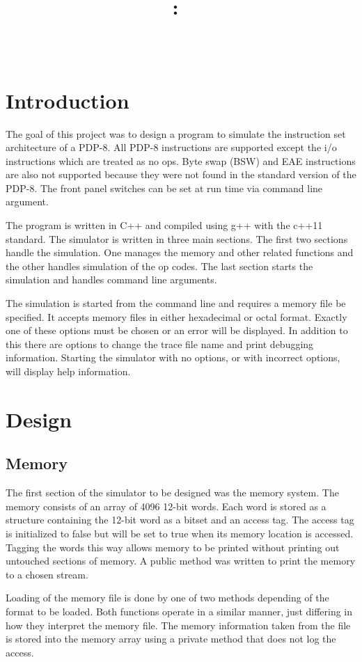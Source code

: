 \documentclass[12pt]{article}
\title{
\vspace{2in}
\textmd{\textbf{\hmwkClass:\ \hmwkTitle}}\\
\normalsize\vspace{0.1in}\small{\hmwkDueDate}\\
\vspace{3in}
\date{}
}
\author{\textbf{\hmwkAuthorName}}
\begin{document}
\maketitle
\newpage
\section{Introduction}
The goal of this project was to design a program to simulate the instruction set architecture of a PDP-8.  All PDP-8 instructions are supported except the i/o instructions which are treated as no ops. Byte swap (BSW) and EAE instructions are also not supported because they were not found in the standard version of the PDP-8. The front panel switches can be set at run time via command line argument.

The program is written in C++ and compiled using g++ with the c++11 standard. The simulator is written in three main sections. The first two sections handle the simulation. One manages the memory and other related functions and the other handles simulation of the op codes. The last section starts the simulation and handles command line arguments.  

The simulation is started from the command line and requires a memory file be specified. It accepts memory files in either hexadecimal or octal format. Exactly one of these options must be chosen or an error will be displayed. In addition to this there are options to change the trace file name and print debugging information. Starting the simulator with no options, or with incorrect options, will display help information.

\section{Design}
\subsection{Memory}
The first section of the simulator to be designed was the memory system. The memory consists of an array of 4096 12-bit words. Each word is stored as a structure containing the 12-bit word as a bitset and an access tag. The access tag is initialized to false but will be set to true when its memory location is accessed. Tagging the words this way allows memory to be printed without printing out untouched sections of memory. A public method was written to print the memory to a chosen stream. 

Loading of the memory file is done by one of two methods depending of the format to be loaded. Both functions operate in a similar manner, just differing in how they interpret the memory file. The memory information taken from the file is stored into the memory array using a private method that does not log the access.
\end{document}
